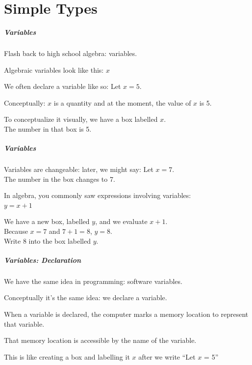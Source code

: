 \part{Simple Types}
\begin{frame}\partpage\end{frame}

\begin{frame}
\frametitle{Variables}
Flash back to high school algebra: variables.

Algebraic variables look like this: $x$

We often \alert{declare} a variable like so: Let $x = 5$.

Conceptually: $x$ is a quantity and at the moment, the value of $x$ is 5.

To conceptualize it visually, we have a box labelled $x$. \\ \quad The number in that box is 5.

\end{frame}

\begin{frame}
\frametitle{Variables}

Variables are changeable: later, we might say: Let $x = 7$.\\
\quad The number in the box changes to 7.

In algebra, you commonly saw expressions involving variables:\\
\quad $y = x + 1$

We have a new box, labelled $y$, and we evaluate $x + 1$.\\
\quad Because $x = 7$ and $7 + 1 = 8$, $y = 8$.\\
\quad Write $8$ into the box labelled $y$.

\end{frame}

\begin{frame}
\frametitle{Variables: Declaration}

We have the same idea in programming: software variables.

Conceptually it's the same idea: we \alert{declare} a variable.

When a variable is declared, the computer marks a memory location to represent that variable. 

That memory location is accessible by the name of the variable.

This is like creating a box and labelling it $x$ after we write ``Let $x$ = 5''

\end{frame}

